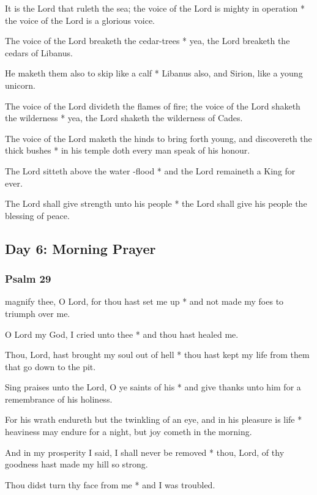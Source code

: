 It is the Lord that ruleth the sea; the voice of the Lord is mighty in operation * the voice of the Lord is a glorious voice.

The voice of the Lord breaketh the cedar-trees * yea, the Lord breaketh the cedars of Libanus.

He maketh them also to skip like a calf * Libanus also, and Sirion, like a young unicorn.

The voice of the Lord divideth the flames of fire; the voice of the Lord shaketh the wilderness * yea, the Lord shaketh the wilderness of Cades.

The voice of the Lord maketh the hinds to bring forth young, and discovereth the thick bushes * in his temple doth every man speak of his honour.

The Lord sitteth above the water -flood * and the Lord remaineth a King for ever.

The Lord shall give strength unto his people * the Lord shall give his people the blessing of peace.

\subsection{Day 6: Morning Prayer}

\subsubsection{Psalm 29}


 magnify thee, O Lord, for thou hast set me up * and not made my foes to triumph over me.

O Lord my God, I cried unto thee * and thou hast healed me.

Thou, Lord, hast brought my soul out of hell * thou hast kept my life from them that go down to the pit.

Sing praises unto the Lord, O ye saints of his * and give thanks unto him for a remembrance of his holiness.

For his wrath endureth but the twinkling of an eye, and in his pleasure is life * heaviness may endure for a night, but joy cometh in the morning.

And in my prosperity I said, I shall never be removed * thou, Lord, of thy goodness hast made my hill so strong.

Thou didst turn thy face from me * and I was troubled.

